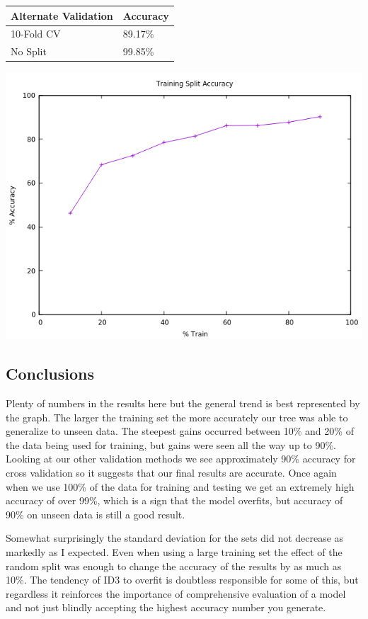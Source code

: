 \documentclass[11pt, letterpaper]{report}
\begin{document}
\bigskip
\begin{tabular}{ |l|l| }
    \hline
    \textbf{Alternate Validation} & \textbf{Accuracy} \\ \hline
    10-Fold CV & 89.17\% \\ \hline
    No Split & 99.85\% \\ \hline
\end{tabular}

\bigskip
\includegraphics[scale=0.75]{../img/train_split_graph}

\subsection{Conclusions}

Plenty of numbers in the results here but the general trend is best represented by the graph. The larger the training set the more accurately our tree was able to generalize to unseen data. The steepest gains occurred between 10\% and 20\% of the data being used for training, but gains were seen all the way up to 90\%. Looking at our other validation methods we see approximately 90\% accuracy for cross validation so it suggests that our final results are accurate. Once again when we use 100\% of the data for training and testing we get an extremely high accuracy of over 99\%, which is a sign that the model overfits, but accuracy of 90\% on unseen data is still a good result.

Somewhat surprisingly the standard deviation for the sets did not decrease as markedly as I expected. Even when using a large training set the effect of the random split was enough to change the accuracy of the results by as much as 10\%. The tendency of ID3 to overfit is doubtless responsible for some of this, but regardless it reinforces the importance of comprehensive evaluation of a model and not just blindly accepting the highest accuracy number you generate.
\end{document}
